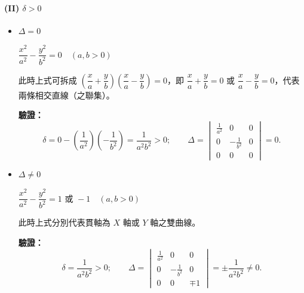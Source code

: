 \paragraph*{(II) $\delta > 0$}
\begin{itemize}
  \item[(i)] $\Delta = 0$
  \begin{example}
  $\dfrac{x^2}{a^2} - \dfrac{y^2}{b^2} = 0 \quad (a, b > 0)$
  
  此時上式可拆成 $\left(\dfrac{x}{a} + \dfrac{y}{b}\right)\left(\dfrac{x}{a} - \dfrac{y}{b}\right) = 0$，即 $\dfrac{x}{a} + \dfrac{y}{b} = 0$ 或 $\dfrac{x}{a} - \dfrac{y}{b} = 0$，代表兩條相交直線（之聯集）。
  
  \textbf{驗證：}
  \[
  \delta = 0 - \left(\frac{1}{a^2}\right)\left(-\frac{1}{b^2}\right) = \frac{1}{a^2 b^2} > 0; \qquad
  \Delta = \begin{vmatrix} \frac{1}{a^2} & 0 & 0 \\ 0 & -\frac{1}{b^2} & 0 \\ 0 & 0 & 0 \end{vmatrix} = 0.
  \]
  \end{example}

  \item[(ii)] $\Delta \ne 0$
  \begin{example}
  $\dfrac{x^2}{a^2} - \dfrac{y^2}{b^2} = 1 \text{ 或 } -1 \quad (a, b > 0)$
  
  此時上式分別代表貫軸為 $X$ 軸或 $Y$ 軸之雙曲線。
  
  \textbf{驗證：}
  \[
  \delta = \frac{1}{a^2 b^2} > 0; \qquad
  \Delta = \begin{vmatrix} \frac{1}{a^2} & 0 & 0 \\ 0 & -\frac{1}{b^2} & 0 \\ 0 & 0 & \mp 1 \end{vmatrix} = \pm \frac{1}{a^2 b^2} \ne 0.
  \]
  \end{example}
\end{itemize}

